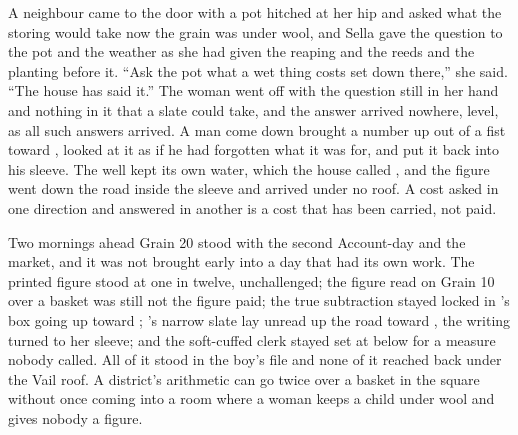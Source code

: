 A neighbour came to the door with a pot hitched at her hip and asked what the storing would take now the grain was under wool, and Sella gave the question to the pot and the weather as she had given the reaping and the reeds and the planting before it. “Ask the pot what a wet thing costs set down there,” she said. “The house has said it.” The woman went off with the question still in her hand and nothing in it that a slate could take, and the answer arrived nowhere, level, as all such answers arrived. A man come down  brought a number up out of a fist toward , looked at it as if he had forgotten what it was for, and put it back into his sleeve. The well kept its own water, which the house called , and the figure went down the road inside the sleeve and arrived under no roof. A cost asked in one direction and answered in another is a cost that has been carried, not paid.

Two mornings ahead Grain 20 stood with the second Account-day and the market, and it was not brought early into a day that had its own work. The printed figure stood at one in twelve, unchallenged; the figure read on Grain 10 over a basket was still not the figure paid; the true subtraction stayed locked in 's box going up toward ; 's narrow slate lay unread up the road toward , the writing turned to her sleeve; and the soft-cuffed clerk stayed set at  below  for a measure nobody called. All of it stood in the boy's file and none of it reached back under the Vail roof. A district's arithmetic can go twice over a basket in the square without once coming into a room where a woman keeps a child under wool and gives nobody a figure.

\scenebreak

